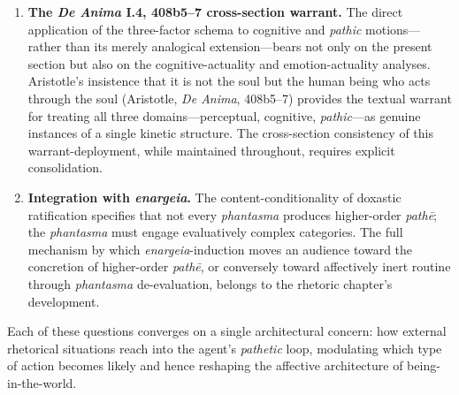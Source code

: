 \documentclass{article}
\begin{document}
\begin{enumerate}
respect to our human being-in-the-world'' will anchor the analysis of \textit{Mitsein}-mediated persuasion. \item \textbf{The \textit{De Anima} I.4, 408b5--7 cross-section warrant.} The direct application of the three-factor schema to cognitive and \textit{pathic} motions---rather than its merely analogical extension---bears not only on the present section but also on the cognitive-actuality and emotion-actuality analyses. Aristotle's insistence that it is not the soul but the human being who acts through the soul (Aristotle, \textit{De Anima}, 408b5--7) provides the textual warrant for treating all three domains---perceptual, cognitive, \textit{pathic}---as genuine instances of a single kinetic structure. The cross-section consistency of this warrant-deployment, while maintained throughout, requires explicit consolidation. \item \textbf{Integration with \textit{enargeia}.} The content-conditionality of doxastic ratification specifies that not every \textit{phantasma} produces higher-order \textit{pathē}; the \textit{phantasma} must engage evaluatively complex categories. The full mechanism by which \textit{enargeia}-induction moves an audience toward the concretion of higher-order \textit{pathē}, or conversely toward affectively inert routine through \textit{phantasma} de-evaluation, belongs to the rhetoric chapter's development. \end{enumerate}

Each of these questions converges on a single architectural concern: how external rhetorical situations reach into the agent's \textit{pathetic} loop, modulating which type of action becomes likely and hence reshaping the affective architecture of being-in-the-world.

\end{document}
